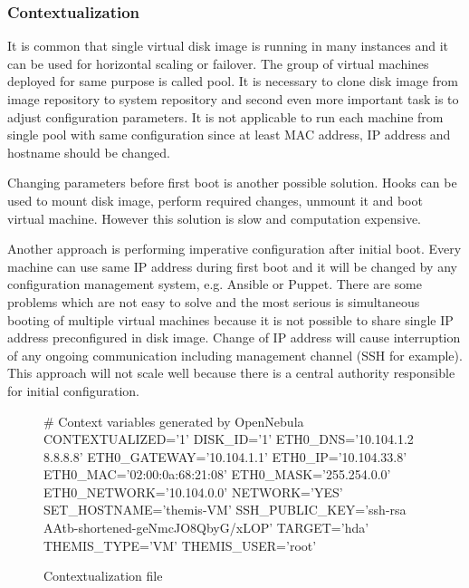 \subsubsection{Contextualization}
It is common that single virtual disk image is running in many instances and it can be used for horizontal scaling or failover. The group of virtual machines deployed for same purpose is called pool. It is necessary to clone disk image from image repository to system repository and second even more important task is to adjust configuration parameters. It is not applicable to run each machine from single pool with same configuration since at least \Ac{MAC} address, \Ac{IP} address and hostname should be changed.

Changing parameters before first boot is another possible solution. Hooks can be used to mount disk image, perform required changes, unmount it and boot virtual machine. However this solution is slow and computation expensive.

Another approach is performing imperative configuration after initial boot. Every machine can use same \Ac{IP} address during first boot and it will be changed by any configuration management system, e.g. Ansible or Puppet. There are some problems which are not easy to solve and the most serious is simultaneous booting of multiple virtual machines because it is not possible to share single \Ac{IP} address preconfigured in disk image. Change of \Ac{IP} address will cause interruption of any ongoing communication including management channel (\Ac{SSH} for example). This approach will not scale well because there is a central authority responsible for initial configuration.

\begin{figure}[htb]
\caption{Contextualization file}
\label{code:template}
\begin{verbatimtab}
# Context variables generated by OpenNebula
CONTEXTUALIZED='1'
DISK_ID='1'
ETH0_DNS='10.104.1.2 8.8.8.8'
ETH0_GATEWAY='10.104.1.1'
ETH0_IP='10.104.33.8'
ETH0_MAC='02:00:0a:68:21:08'
ETH0_MASK='255.254.0.0'
ETH0_NETWORK='10.104.0.0'
NETWORK='YES'
SET_HOSTNAME='themis-VM'
SSH_PUBLIC_KEY='ssh-rsa AAtb-shortened-geNmcJO8QbyG/xLOP'
TARGET='hda'
THEMIS_TYPE='VM'
THEMIS_USER='root'
\end{verbatimtab}
\end{figure}

